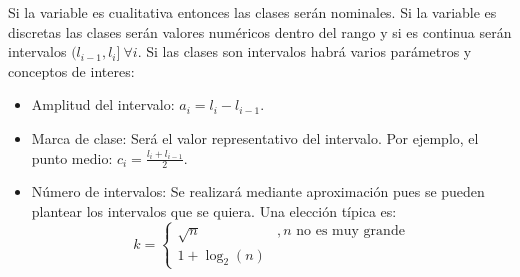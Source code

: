 \documentclass[10pt,a4paper]{book}
\begin{document}
Si la variable es cualitativa entonces las clases serán nominales. Si la variable es discretas las clases serán valores numéricos dentro del rango y si es continua serán intervalos $(l_{i-1},l_i]\:\forall i$. Si las clases son intervalos habrá varios parámetros y conceptos de interes: 
\begin{itemize}
	\item Amplitud del intervalo: $a_i = l_i -l_{i-1}$.
	\item Marca de clase: Será el valor representativo del intervalo. Por ejemplo, el punto medio: $c_i = \frac{l_i + l_{i-1}}{2}$.
	\item Número de intervalos: Se realizará mediante aproximación pues se pueden plantear los intervalos que se quiera. Una elección típica es: 
		\[k = \begin{cases}
			\sqrt{n} & ,n \text{ no es muy grande}\\
			1+\log_2(n) 
		\end{cases}\]
\end{itemize}
\end{document}
